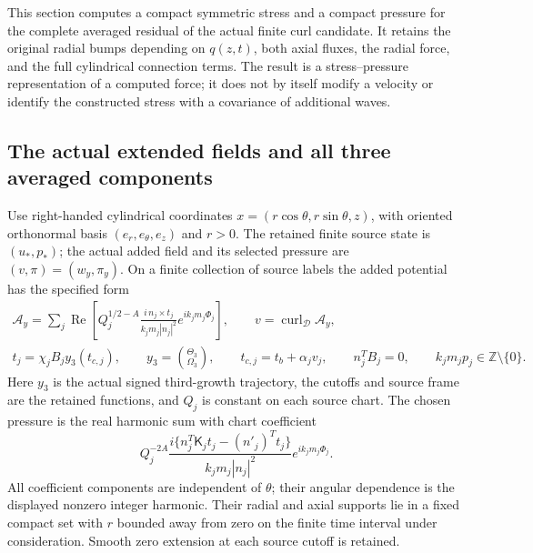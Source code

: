 \documentclass[11pt]{article}
\begin{document}
This section computes a compact symmetric stress and a compact pressure
for the complete averaged residual of the actual finite curl candidate.
It retains the original radial bumps depending on $q(z,t)$, both axial
fluxes, the radial force, and the full cylindrical connection terms.
The result is a stress--pressure representation of a computed force;
it does not by itself modify a velocity or identify the constructed
stress with a covariance of additional waves.

\subsection{The actual extended fields and all three averaged components}

Use right-handed cylindrical coordinates
$x=(r\cos\theta,r\sin\theta,z)$, with oriented orthonormal basis
$(e_r,e_\theta,e_z)$ and $r>0$. The retained finite source state is
$(u_*,p_*)$; the actual added field and its selected pressure are
$(v,\pi)=(w_y,\pi_y)$. On a finite collection of source labels the
added potential has the specified form
\begin{equation}\label{mcstress:actual_potential}
\begin{gathered}
 \mathcal A_y=\sum_j\operatorname{Re}
   \left[Q_j^{1/2-A}
     \frac{i\,n_j\times t_j}{k_jm_j|n_j|^2}
                      e^{ik_jm_j\Phi_j}\right],\qquad
 v=\operatorname{curl}_{\mathscr D}\mathcal A_y,\\
 t_j=\chi_jB_jy_3(t_{c,j}),\qquad
 y_3=\binom{\Theta_3}{\Omega_3},\qquad
 t_{c,j}=t_b+\alpha_jv_j,\qquad
 n_j^TB_j=0,\qquad k_jm_jp_j\in\mathbb Z\setminus\{0\}.
\end{gathered}
\end{equation}
Here $y_3$ is the actual signed third-growth trajectory, the cutoffs
and source frame are the retained functions, and $Q_j$ is constant
on each source chart. The chosen pressure is the real harmonic sum
with chart coefficient
\[
 Q_j^{-2A}
 \frac{i\{n_j^T\mathsf K_jt_j-(n'_j)^Tt_j\}}
      {k_jm_j|n_j|^2}e^{ik_jm_j\Phi_j}.
\]
All coefficient components are independent of $\theta$; their angular
dependence is the displayed nonzero integer harmonic. Their radial
and axial supports lie in a fixed compact set with $r$ bounded away
from zero on the finite time interval under consideration. Smooth
zero extension at each source cutoff is retained.
\end{document}
